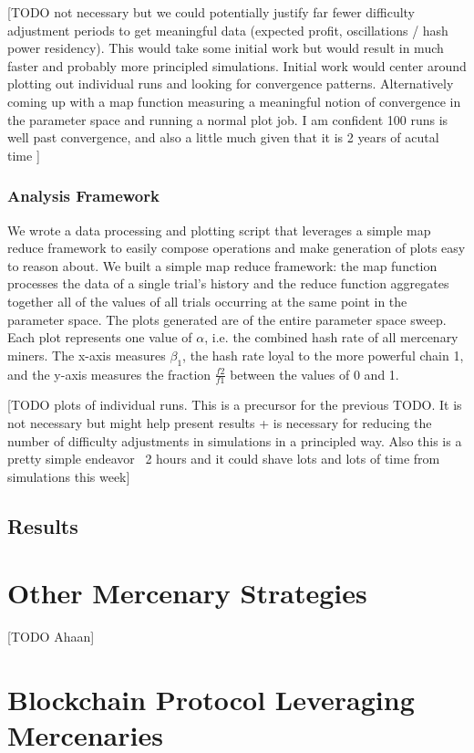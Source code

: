 \documentclass[10pt, preprint]{aastex}
\begin{document}
[TODO not necessary but we could potentially justify far fewer difficulty adjustment periods to get meaningful data (expected profit, oscillations / hash power residency).  This would take some initial work but would result in much faster and probably more principled simulations.  Initial work would center around plotting out individual runs and looking for convergence patterns.  Alternatively coming up with a map function measuring a meaningful notion of convergence in the parameter space and running a normal plot job.  I am confident 100 runs is well past convergence, and also a little much given that it is 2 years of acutal time ]

\subsubsection{Analysis Framework}
We wrote a data processing and plotting script that leverages a simple map reduce framework to easily compose operations and make generation of plots easy to reason about.  We built a simple map reduce framework: the map function processes the data of a single trial's history and the reduce function aggregates together all of the values of all trials occurring at the same point in the parameter space.  The plots generated are of the entire parameter space sweep.  Each plot represents one value of $\alpha$, i.e. the combined hash rate of all mercenary miners.  The x-axis measures $\beta_1$, the hash rate loyal to the more powerful chain 1, and the y-axis measures the fraction $\frac{f2}{f1}$ between the values of 0 and 1.

[TODO plots of individual runs.  This is a precursor for the previous TODO.  It is not necessary but might help present results + is necessary for reducing the number of difficulty adjustments in simulations in a principled way.  Also this is a pretty simple endeavor ~2 hours and it could shave lots and lots of time from simulations this week]
\subsection{Results}


\section{Other Mercenary Strategies}
[TODO Ahaan]


\section{Blockchain Protocol Leveraging Mercenaries}
\end{document}
